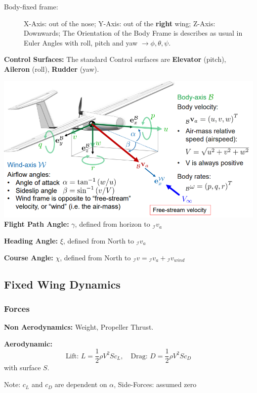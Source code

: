 \documentclass[fontsize=6pt,DIV=calc,a4paper,ngerman]{scrartcl}
\begin{document}
\begin{multicols*}{4}
\begin{description}
		\item[Body-fixed frame:]X-Axis: out of the nose;
		      Y-Axis: out of the \textbf{right} wing;
		      Z-Axis: Downwards; The Orientation of the Body Frame is describes as usual in Euler Angles with roll, pitch and yaw $\rightarrow \phi, \theta,\psi$.
	\end{description}

	\textbf{Control Surfaces:} The standard Control surfaces are \textbf{Elevator} (pitch), \textbf{Aileron} (roll), \textbf{Rudder} (yaw).

	\includegraphics[width=0.8\linewidth]{Fixedwing_kin.png}\\

	\textbf{Flight Path Angle:} $\gamma$, defined from horizon to ${}_\mathcal{I}v_a$

	\textbf{Heading Angle:} $\xi$, defined from North to ${}_\mathcal{I}v_a$

	\textbf{Course Angle:} $\chi$, defined from North to ${}_\mathcal{I}v = {}_\mathcal{I}v_a + {}_\mathcal{I}v_{wind}$

	\subsection{Fixed Wing Dynamics}
	\subsubsection{Forces}

	\textbf{Non Aerodynamics:} Weight, Propeller Thrust.

	\textbf{Aerodynamic:} $$\text{Lift: }L=\frac{1}{2}\rho V^2Sc_L, \quad \text{Drag: } D=\frac{1}{2}\rho V^2Sc_D $$ with surface $S$.

	Note: $c_L$ and $c_D$ are dependent on $\alpha$, Side-Forces: assumed zero


\end{multicols*}
\end{document}
